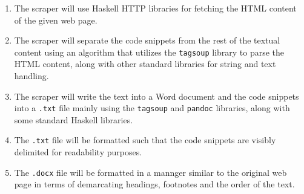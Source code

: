 \documentclass{scrreprt}
\begin{document}
\begin{enumerate}
    \item The scraper will use Haskell HTTP libraries for fetching the HTML content of the given web page.
    \item The scraper will separate the code snippets from the rest of the textual content using an algorithm that utilizes the \texttt{tagsoup} library to parse the HTML content, along with other standard libraries for string and text handling.
    \item The scraper will write the text into a Word document and the code snippets into a \texttt{.txt} file mainly using the \texttt{tagsoup} and \texttt{pandoc} libraries, along with some standard Haskell libraries.
    \item The \texttt{.txt} file will be formatted such that the code snippets are visibly delimited for readability purposes.
    \item The \texttt{.docx} file will be formatted in a mannger similar to the original web page in terms of demarcating headings, footnotes and the order of the text. 
\end{enumerate}




\end{document}
